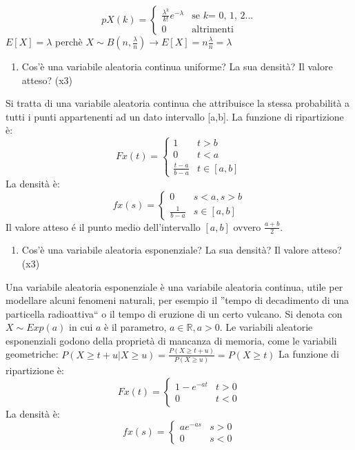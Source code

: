 \[pX(k)= \begin{cases} \frac{\lambda^k}{k!} e^{-\lambda} & \mbox{se } k\mbox{= 0, 1, 2...} \\ 0 & \mbox{altrimenti } \end{cases} \]
$E[X] = \lambda$ perchè $X \sim B(n,\frac{\lambda}{n}) \to E[X]= n \frac{\lambda}{n} = \lambda$
\begin{enumerate}[resume]\bfseries
	\item Cos'è una variabile aleatoria continua uniforme? La sua densità? Il valore atteso? (x3)
\end{enumerate}
Si tratta di una variabile aleatoria continua che attribuisce la stessa probabilità a tutti i punti appartenenti ad un dato intervallo [a,b].
La funzione di ripartizione è:
\[Fx(t)=   \begin{cases}{1}
& t>b  \\ 0 & t< a \\ \frac{t-a}{b-a} & t \in [a,b]\end{cases} \]
La densità è:
\[fx(s)=   \begin{cases}{0}
& s<a, s>b  \\ \frac{1}{b-a}& s \in [a,b] \end{cases} \]
Il valore atteso é il punto medio dell'intervallo $[a,b]$ ovvero $\frac{a+b}{2}$.
\begin{enumerate}[resume]\bfseries
\item Cos'è una variabile aleatoria esponenziale? La sua densità? Il valore atteso? (x3)
\end{enumerate}
Una variabile aleatoria esponenziale è una variabile aleatoria continua, utile per modellare alcuni
fenomeni naturali, per esempio il ”tempo di decadimento di una particella radioattiva“ o il tempo di eruzione di un certo vulcano.\newline
Si denota con $X \sim Exp(a)$ in cui $a$ è il parametro, $a \in \mathbb{R}, a > 0$.\newline
Le variabili aleatorie esponenziali godono della proprietà di mancanza di memoria, come le variabili geometriche:\newline
$P(X \ge t+u|X \ge u)={\frac {P(X \ge t+u)}{P(X \ge u)}}=P(X \ge t)$
La funzione di ripartizione è:
\[Fx(t)=   \begin{cases}{1 -  e^{-at}}
& t>0  \\ 0 & t< 0 \end{cases} \]
La densità è:
\[fx(s)=   \begin{cases}{ae^{-as}}
& s>0  \\ 0 & s< 0 \end{cases} \]
